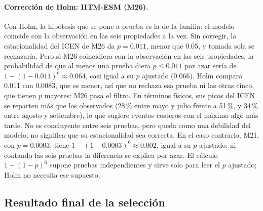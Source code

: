 \documentclass[11pt,a4paper]{article}
\begin{document}
\paragraph{Corrección de Holm: IITM-ESM (M26).} Con Holm, la hipótesis que se pone a prueba es la de la familia: el modelo coincide con la observación en las seis propiedades a la vez. Sin corregir, la estacionalidad del ICEN de M26 da $p = 0.011$, menor que 0.05, y tomada sola se rechazaría. Pero si M26 coincidiera con la observación en las seis propiedades, la probabilidad de que al menos una prueba diera $p \leq 0.011$ por azar sería de $1-(1-0.011)^6 \approx 0.064$, casi igual a su $p$ ajustado (0.066). Holm compara 0.011 con 0.0083, que es menor, así que no rechaza esa prueba ni las otras cinco, que tienen $p$ mayores: M26 pasa el filtro. En términos físicos, sus picos del ICEN se reparten más que los observados (28\,\% entre mayo y julio frente a 51\,\%, y 34\,\% entre agosto y setiembre), lo que sugiere eventos costeros con el máximo algo más tarde. No es concluyente entre seis pruebas, pero queda como una debilidad del modelo; no significa que su estacionalidad sea correcta. En el caso contrario, M21, con $p = 0.0003$, tiene $1-(1-0.0003)^6 \approx 0.002$, igual a su $p$ ajustado: ni contando las seis pruebas la diferencia se explica por azar. El cálculo $1-(1-p)^6$ supone pruebas independientes y sirve solo para leer el $p$ ajustado; Holm no necesita ese supuesto.

\subsection{Resultado final de la selección}
\label{sec:seleccion}
\end{document}
